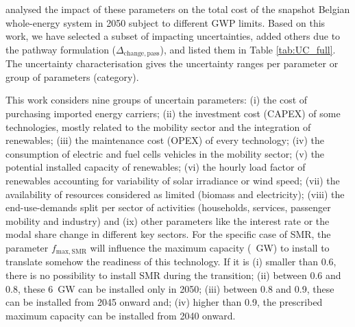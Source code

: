 \citet{rixhon2021role} analysed the impact of these parameters on the total cost of the snapshot Belgian whole-energy system in 2050 subject to different \gls{GWP} limits. Based on this work, we have selected a subset of impacting uncertainties, added others due to the pathway formulation (\eg $\Delta_{\mathrm{change,pass}}$), and listed them in Table \ref{tab:UC_full}. The uncertainty characterisation gives the uncertainty ranges per parameter or group of parameters (category).

This work considers nine groups of uncertain parameters: (i) the cost of purchasing imported energy carriers; (ii) the investment cost (\ie CAPEX) of some technologies, mostly related to the mobility sector and the integration of renewables; (iii) the maintenance cost (\ie OPEX) of every technology; (iv) the consumption of electric and fuel cells vehicles in the mobility sector; (v) the potential installed capacity of renewables; (vi) the hourly load factor of renewables accounting for variability of solar irradiance or wind speed; (vii) the availability of resources considered as limited (\ie biomass and electricity); (viii) the end-use-demands split per sector of activities (\ie households, services, passenger mobility and industry) and (ix) other parameters like the interest rate or the modal share change in different key sectors. For the specific case of \gls{SMR}, the parameter $f_{\mathrm{max,SMR}}$ will influence the maximum capacity (~GW) to install to translate somehow the readiness of this technology. If it is (i) smaller than 0.6, there is no possibility to install \gls{SMR} during the transition; (ii) between 0.6 and 0.8, these 6~GW can be installed only in 2050; (iii) between 0.8 and 0.9, these can be installed from 2045 onward and; (iv) higher than 0.9, the prescribed maximum capacity can be installed from 2040 onward. 



